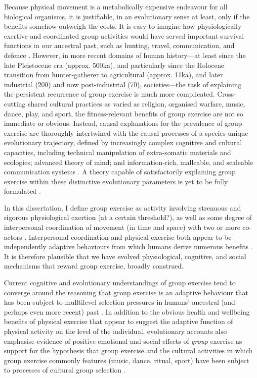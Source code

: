 Because physical movement is a metabolically expensive endeavour for all biological organisms, it is justifiable, in an evolutionary sense at least, only if the benefits somehow outweigh the costs.  It is easy to imagine how physiologically exertive and coordinated group activities would have served important survival functions in our ancestral past, such as hunting, travel, communication, and defence \citep{Sands2010}. However, in more recent domains of human history---at least since the late Pleistocene era (approx. 500ka), and particularly since the Holocene transition from hunter-gatherer to agricultural (approx. 11ka), and later industrial (200) and now post-industrial (70), societies---the task of explaining the persistent recurrence of group exercise is much more complicated.  Cross-cutting shared cultural practices as varied as religion, organised warfare, music, dance, play, and sport, the fitness-relevant benefits of group exercise are not so immediate or obvious.  Instead, causal explanations for the prevalence of group exercise are thoroughly intertwined with the causal processes of a species-unique evolutionary trajectory, defined by increasingly complex cognitive and cultural capacities, including technical manipulation of extra-somatic materials and ecologies; advanced theory of mind; and information-rich, malleable, and scaleable communication systems \citep{Fuentes2016}.  A theory capable of satisfactorily explaining group exercise within these distinctive evolutionary parameters is yet to be fully formulated \citep{Cohen2017}.

In this dissertation, I define group exercise as activity involving strenuous and rigorous physiological exertion (at a certain threshold?), as well as some degree of interpersonal coordination of movement (in time and space) with two or more co-actors \citep{Cohen2017}. Interpersonal coordination and physical exercise both appear to be independently adaptive behaviours from which humans derive numerous benefits \citep{Tomasello2014}.  It is therefore plausible that we have evolved physiological, cognitive, and social mechanisms that reward group exercise, broadly construed.

Current cognitive and evolutionary understandings of group exercise tend to converge around the reasoning that group exercise is an adaptive behaviour that has been subject to mulltilevel selection pressures in humans' ancestral (and perhaps even more recent) past \citep{Sands2012,Dunbar2010,Cohen2017}. In addition to the obvious health and wellbeing benefits of physical exercise that appear to suggest the adaptive function of physical activity on the level of the individual, evolutionary accounts also emphasise evidence of positive emotional and social effects of \textit{group} exercise as support for the hypothesis that group exercise and the cultural activities in which group exercise commonly features (music, dance, ritual, sport) have been subject to processes of cultural group selection \citep{Dunbar2010,Whitehouse2004,Atkinson2011a}.

